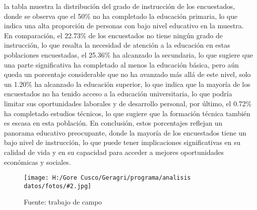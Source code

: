 \documentclass{article}\usepackage[]{graphicx}\usepackage[table]{xcolor}
\makeatletter
\newenvironment{kframe}{%
 \def\at@end@of@kframe{}%
 \ifinner\ifhmode%
  \def\at@end@of@kframe{\end{minipage}}%
  \begin{minipage}{\columnwidth}%
 \fi\fi%
 \def\FrameCommand##1{\hskip\@totalleftmargin \hskip-\fboxsep
 \colorbox{shadecolor}{##1}\hskip-\fboxsep
     \hskip-\linewidth \hskip-\@totalleftmargin \hskip\columnwidth}%
 \MakeFramed {\advance\hsize-\width
   \@totalleftmargin\z@ \linewidth\hsize
   \@setminipage}}%
 {\par\unskip\endMakeFramed%
 \at@end@of@kframe}
\newenvironment{fotos}[2]
{\begin{figure}[H]
	\centering
	\caption{#1}
	\texttt{[image: H:/Gore Cusco/Geragri/programa/analisis datos/fotos/\#2.jpg]}
	\caption*{Fuente: trabajo de campo}}
{\end{figure}}
\makeatother
\begin{document}
la tabla muestra la distribución del grado de instrucción de los encuestados, donde se observa que el 50\% no ha completado la educación primaria, lo que indica una alta proporción de personas con bajo nivel educativo en la muestra. En comparación, el 22.73\% de los encuestados no tiene ningún grado de instrucción, lo que resalta la necesidad de atención a la educación en estas poblaciones encuestadas, el 25.36\% ha alcanzado la secundaria, lo que sugiere que una parte significativa ha completado al menos la educación básica, pero aún queda un porcentaje considerable que no ha avanzado más allá de este nivel, solo un 1.20\% ha alcanzado la educación superior, lo que indica que la mayoría de los encuestados no ha tenido acceso a la educación universitaria, lo que podría limitar sus oportunidades laborales y de desarrollo personal, por último, el 0.72\% ha completado estudios técnicos, lo que sugiere que la formación técnica también es escasa en esta población. En conclusión, estos porcentajes reflejan un panorama educativo preocupante, donde la mayoría de los encuestados tiene un bajo nivel de instrucción, lo que puede tener implicaciones significativas en su calidad de vida y en su capacidad para acceder a mejores oportunidades económicas y sociales.
\begin{fotos}
{Aplicacion de encuestas}{2}
\end{fotos}


\begin{table}[H]
  \centering
  \caption{Tipo de ingreso familiar}
\begin{kframe}


{\ttfamily\noindent\bfseries{}}

{\ttfamily\noindent\bfseries{}}

{\ttfamily\noindent\bfseries\color{errorcolor}{\#\# Error: objeto 'datos' no encontrado}}

{\ttfamily\noindent\bfseries\color{errorcolor}{\#\# Error: objeto 'datos' no encontrado}}

{\ttfamily\noindent\bfseries\color{errorcolor}{\#\# Error: objeto 'datos' no encontrado}}

{\ttfamily\noindent\bfseries\color{errorcolor}{\#\# Error: objeto 'filtered\_data' no encontrado}}

{\ttfamily\noindent\bfseries\color{errorcolor}{\#\# Error: objeto 'filtered\_data' no encontrado}}

{\ttfamily\noindent\bfseries\color{errorcolor}{\#\# Error: objeto 'tabla' no encontrado}}

{\ttfamily\noindent\bfseries\color{errorcolor}{\#\# Error: objeto 'tabla' no encontrado}}

{\ttfamily\noindent\bfseries\color{errorcolor}{\#\# Error: objeto 'tabla\_latex' no encontrado}}\end{kframe}
  \caption*{Fuente: Trabajo de campo}
\end{table}
\end{document}
